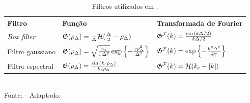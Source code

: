 \begin{table}[h!]
    \centering
    \caption{Filtros utilizados em \LES.}
    \begin{tabular}{lll}
        \hline
        Filtro              & Função                                                                                                               & Transformada de Fourier                                                  \\\hline
        \textit{Box filter} & $\mathfrak{G}(\rho_\Delta)=\frac{1}{\Delta}\mathcal{H}(\frac{\Delta}{2}-\rho_\Delta)$                                      & ${\mathfrak{G}}^{\mathcal{F}}(k)=\frac{\sin{(k\Delta/2)}}{k\Delta/2}$               \\
        Filtro gaussiano    & $\mathfrak{G}(\rho_\Delta)=\sqrt{\frac{\gamma_g}{\pi\Delta^2}}\exp{\left\{-\frac{\gamma\rho_\Delta^2}{\Delta^2}\right\}}$ & ${\mathfrak{G}}^{\mathcal{F}}(k)=\exp{\left\{-\frac{k^2\Delta^2}{4\gamma}\right\}}$ \\
        Filtro espectral    & $\mathfrak{G}(\rho_\Delta)=\frac{\sin{(k_c\rho_\Delta)}}{k_c\rho_\Delta}$                                                 & ${\mathfrak{G}}^{\mathcal{F}}(k)=\mathcal{H}(k_c-|k|)$                               \\\hline
    \end{tabular}
    \\Fonte:  - Adaptado.
    \label{tab:filters}
\end{table}

